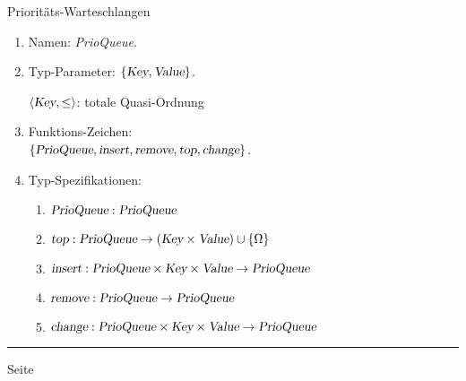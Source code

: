 \documentclass{slides}
\newcounter{mypage}
\begin{document}
\begin{slide}{}
\normalsize

\begin{center}
Priorit\"ats-Warteschlangen
\end{center}
\vspace*{0.5cm}

\footnotesize
\begin{enumerate}

\item Namen: \quad \textsl{PrioQueue}.
\item Typ-Parameter: \quad $\{ \textsl{Key}, \textsl{Value} \}$.

      $\langle \textsl{Key}, \leq \rangle$: \quad totale Quasi-Ordnung
\item Funktions-Zeichen:\\[0.1cm]
     \hspace*{1.3cm} 
     $\{ \textsl{PrioQueue}, \textsl{insert}, \textsl{remove}, \textsl{top}, \textsl{change} \}$.
\item Typ-Spezifikationen:
      \begin{enumerate}
      \item $\textsl{PrioQueue}: \textsl{PrioQueue}$
      \item $\textsl{top}: \textsl{PrioQueue} \rightarrow 
             (\textsl{Key} \times \textsl{Value}) \cup \{\Omega\}$
      \item $\textsl{insert}: \textsl{PrioQueue} \times \textsl{Key} \times \textsl{Value}
            \rightarrow \textsl{PrioQueue}$
      \item $\textsl{remove}: \textsl{PrioQueue} \rightarrow \textsl{PrioQueue}$
      \item $\textsl{change}: \textsl{PrioQueue} \times \textsl{Key} \times \textsl{Value}
             \rightarrow \textsl{PrioQueue}$
      \end{enumerate}
\end{enumerate}


\vspace*{\fill}
\tiny \addtocounter{mypage}{1}
\rule{17cm}{1mm}
 \hspace*{\fill} Seite 
\end{slide}

\end{document}
